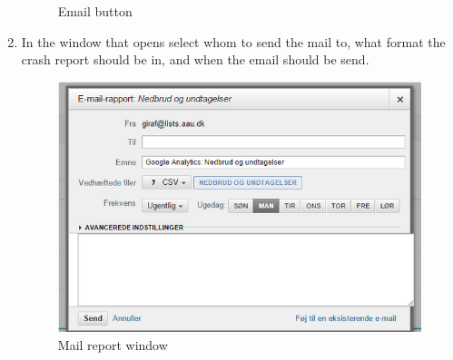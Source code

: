 \begin{enumerate}
\begin{figure}[H]
			\caption{Email button}
			\label{Email}
		\end{figure}
	\item In the window that opens select whom to send the mail to, what format the crash report should be in, and when the email should be send.
		\begin{figure}[H]
			\includegraphics[width=0.8 \textwidth]{pictures/Maillist.png}
			\caption{Mail report window}
			\label{Maillist}
		\end{figure}
\end{enumerate}
	